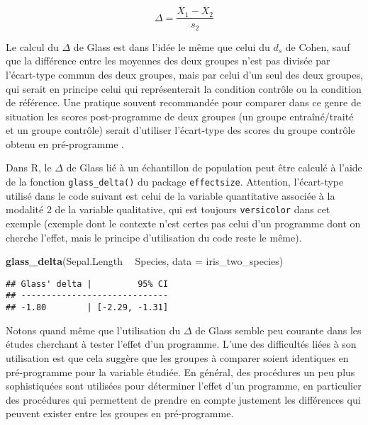 \documentclass[
  french,
]{book}
\newenvironment{Shaded}{\begin{snugshade}}{\end{snugshade}}
\newcommand{\DataTypeTok}[1]{\textcolor[rgb]{0.13,0.29,0.53}{#1}}
\newcommand{\KeywordTok}[1]{\textcolor[rgb]{0.13,0.29,0.53}{\textbf{#1}}}
\newcommand{\NormalTok}[1]{#1}
\newcommand{\OperatorTok}[1]{\textcolor[rgb]{0.81,0.36,0.00}{\textbf{#1}}}
\newcommand{\StringTok}[1]{\textcolor[rgb]{0.31,0.60,0.02}{#1}}
\begin{document}
\[\Delta = \frac{\overline{X}_{1} - \overline{X}_{2}} {s_{2}}\]

Le calcul du \(\Delta\) de Glass est dans l'idée le même que celui du \(d_{s}\) de Cohen, sauf que la différence entre les moyennes des deux groupes n'est pas divisée par l'écart-type commun des deux groupes, mais par celui d'un seul des deux groupes, qui serait en principe celui qui représenterait la condition contrôle ou la condition de référence. Une pratique souvent recommandée pour comparer dans ce genre de situation les scores post-programme de deux groupes (un groupe entraîné/traité et un groupe contrôle) serait d'utiliser l'écart-type des scores du groupe contrôle obtenu en pré-programme \autocite{lakensCalculatingReportingEffect2013}.

Dans R, le \(\Delta\) de Glass lié à un échantillon de population peut être calculé à l'aide de la fonction \texttt{glass\_delta()} du package \texttt{effectsize}. Attention, l'écart-type utilisé dans le code suivant est celui de la variable quantitative associée à la modalité 2 de la variable qualitative, qui est toujours \texttt{versicolor} dans cet exemple (exemple dont le contexte n'est certes pas celui d'un programme dont on cherche l'effet, mais le principe d'utilisation du code reste le même).

\begin{Shaded}
\begin{Highlighting}[]
\KeywordTok{glass_delta}\NormalTok{(Sepal.Length }\OperatorTok{~}\StringTok{ }\NormalTok{Species, }
            \DataTypeTok{data =}\NormalTok{ iris_two_species)}
\end{Highlighting}
\end{Shaded}

\begin{verbatim}
## Glass' delta |         95% CI
## -----------------------------
## -1.80        | [-2.29, -1.31]
\end{verbatim}

Notons quand même que l'utilisation du \(\Delta\) de Glass semble peu courante dans les études cherchant à tester l'effet d'un programme. L'une des difficultés liées à son utilisation est que cela suggère que les groupes à comparer soient identiques en pré-programme pour la variable étudiée. En général, des procédures un peu plus sophistiquées sont utilisées pour déterminer l'effet d'un programme, en particulier des procédures qui permettent de prendre en compte justement les différences qui peuvent exister entre les groupes en pré-programme.
\end{document}
